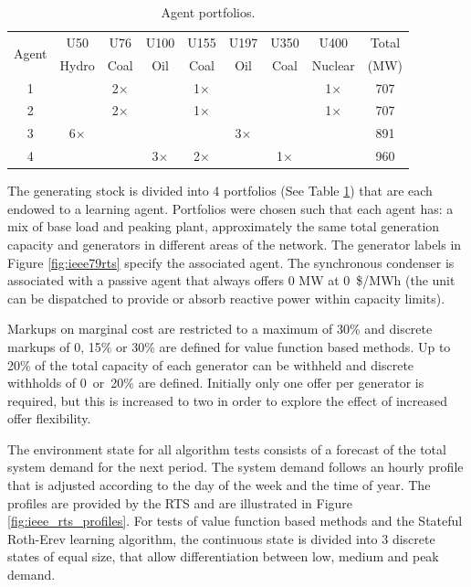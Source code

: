 \begin{table}
\caption{Agent portfolios.}
\label{tbl:agent_portfolios}
\begin{center}
\begin{tabular}{c|c|c|c|c|c|c|c|c}
\hline
\multirow{2}{*}{Agent} &U50 &U76 &U100 &U155 &U197 &U350 &U400 &Total \\
 &Hydro &Coal &Oil &Coal &Oil &Coal &Nuclear &(MW) \\
\hline\hline
1 & &2$\times$ & &1$\times$ & & &1$\times$ &707 \\
2 & &2$\times$ & &1$\times$ & & &1$\times$ &707 \\
3 &6$\times$ & & & &3$\times$ & & &891 \\
4 & & &3$\times$ &2$\times$ & &1$\times$ & &960 \\
\hline
\end{tabular}
\end{center}
\end{table}

The generating stock is divided into 4 portfolios (See Table
\ref{tbl:agent_portfolios}) that are each endowed to a learning agent.
Portfolios were chosen such that each agent has: a mix of base load and peaking
plant, approximately the same total generation capacity and generators in
different areas of the network.  The generator labels in Figure
\ref{fig:ieee79rts} specify the associated agent.  The synchronous condenser is
associated with a passive agent that always offers 0 MW at 0~\$/MWh (the
unit can be dispatched to provide or absorb reactive power within capacity
limits).


Markups on marginal cost are restricted to a maximum of 30\% and discrete
markups of 0, 15\% or 30\% are defined for value function based methods.  Up to
20\% of the total capacity of each generator can be withheld and discrete
withholds of 0~or~20\% are defined.  Initially only one offer per generator is
required, but this is increased to two in order to explore the effect of
increased offer flexibility.

The environment state for all algorithm tests consists of a forecast of the
total system demand for the next period.  The system demand follows an hourly
profile that is adjusted according to the day of the week and the time of year.
The profiles are provided by the RTS and are illustrated in Figure
\ref{fig:ieee_rts_profiles}.  For tests of value function based methods and the
Stateful Roth-Erev learning algorithm, the continuous state is divided into 3
discrete states of equal size, that allow differentiation between low, medium
and peak demand.

